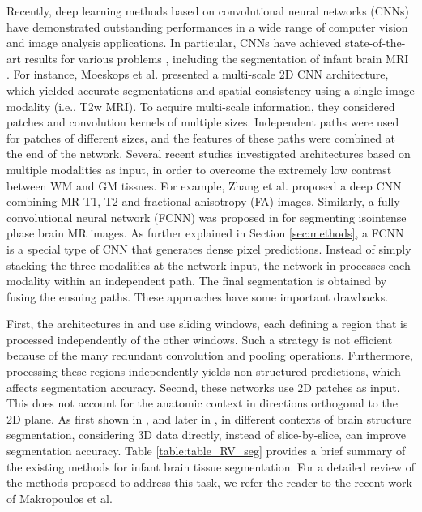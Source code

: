 \documentclass[twoside,espcrc2]{elsarticle}
\begin{document}

Recently, deep learning methods based on convolutional neural networks (CNNs) have demonstrated outstanding performances in a wide range of computer vision and image analysis applications. In particular, CNNs have achieved state-of-the-art results for various problems \cite{long2015fully,kamnitsas2017efficient,DolzNeuro2017,Fechter_Esophagus}, including the segmentation of infant brain MRI \cite{moeskops2016automatic,zhang2015deep,nie2016fully}. For instance, Moeskops et al. \cite{moeskops2016automatic} presented a multi-scale 2D CNN architecture, which yielded accurate segmentations and spatial consistency using a single image modality (i.e., T2w MRI). To acquire multi-scale information, they considered patches and convolution kernels of multiple sizes. Independent paths were used for patches of different sizes, and the features of these paths were combined at the end of the network. Several recent studies investigated architectures based on multiple modalities as input, in order to overcome the extremely low contrast between WM and GM tissues. For example, Zhang et al. \cite{zhang2015deep} proposed a deep CNN combining MR-T1, T2 and fractional anisotropy (FA) images. Similarly, a fully convolutional neural network (FCNN) was proposed in \cite{nie2016fully} for segmenting isointense phase brain MR images. As further explained in Section \ref{sec:methods}, a FCNN is a special type of CNN that generates dense pixel predictions. Instead of simply stacking the three modalities at the network input, the network in \cite{nie2016fully} processes each modality within an independent path. The final segmentation is obtained by fusing the ensuing paths. These approaches have some important drawbacks. 

First, the architectures in \cite{moeskops2016automatic} and \cite{zhang2015deep} use sliding windows, each defining a region that is processed independently of the other windows. Such a strategy is not efficient because of the many redundant convolution and pooling operations. Furthermore, processing these regions independently yields non-structured predictions, which affects segmentation accuracy. Second, these networks use 2D patches as input. This does not account for the anatomic context in directions orthogonal to the 2D plane. As first shown in \cite{kamnitsas2017efficient}, and later in \cite{DolzNeuro2017}, in different contexts of brain structure segmentation, considering 3D data directly, instead of slice-by-slice, can improve segmentation accuracy. Table \ref{table:table_RV_seg} provides a brief summary of the existing methods for infant brain tissue segmentation. For a detailed review of the methods proposed to address this task, we refer the reader to the recent work of Makropoulos et al. \cite{makropoulos2017review}  
\end{document}
